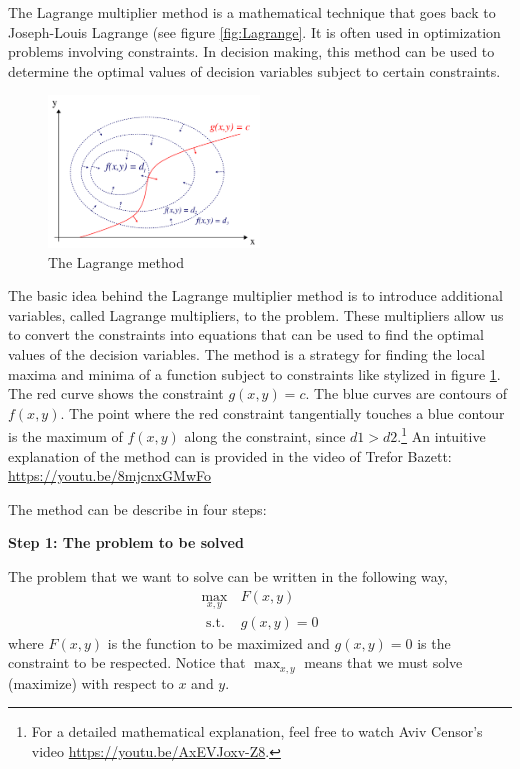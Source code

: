 \documentclass[
  12pt,
  oneside]{book}
\theoremstyle{definition}
\theoremstyle{definition}
\theoremstyle{definition}
\theoremstyle{definition}
\theoremstyle{remark}
\begin{document}
The Lagrange multiplier method is a mathematical technique that goes back to Joseph-Louis Lagrange (see figure \ref{fig:Lagrange}. It is often used in optimization problems involving constraints. In decision making, this method can be used to determine the optimal values of decision variables subject to certain constraints.

\begin{figure}
\centering
\includegraphics[width=0.5\textwidth,height=\textheight]{fig/lagr2.png}
\caption{\label{fig:lagr2} The Lagrange method}
\end{figure}

The basic idea behind the Lagrange multiplier method is to introduce additional variables, called Lagrange multipliers, to the problem. These multipliers allow us to convert the constraints into equations that can be used to find the optimal values of the decision variables. The method is a strategy for finding the local maxima and minima of a function subject to constraints like stylized in figure \ref{fig:lagr2}. The red curve shows the constraint \(g(x, y) = c\). The blue curves are contours of \(f(x, y)\). The point where the red constraint tangentially touches a blue contour is the maximum of \(f(x, y)\) along the constraint, since \(d1 > d2\).\footnote{For a detailed mathematical explanation, feel free to watch Aviv Censor's video \url{https://youtu.be/AxEVJoxv-Z8}.}
An intuitive explanation of the method can is provided in the video of Trefor Bazett: \url{https://youtu.be/8mjcnxGMwFo}

The method can be describe in four steps:

\textbf{Step 1: The problem to be solved}

The problem that we want to solve can be written in the following way,
\[\begin{array}{ll}
\max _{x, y} & F(x, y) \\
\text { s.t. } & g(x, y)=0
\end{array}\] where \(F(x, y)\) is the function to be maximized and
\(g(x, y)=0\) is the constraint to be respected. Notice that
\(\max _{x, y}\) means that we must solve (maximize) with respect to \(x\) and \(y\).
\end{document}
